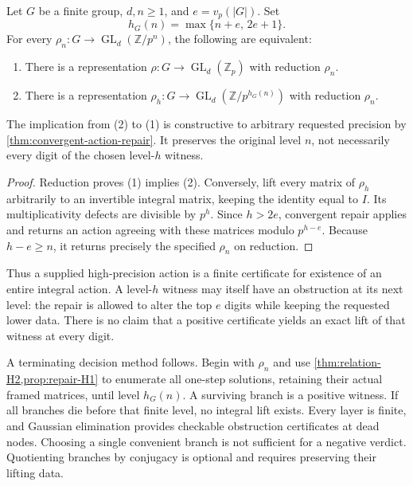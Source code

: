 \begin{theorem}\label{thm:finite-action-horizon}
Let $G$ be a finite group, $d,n\geq1$, and $e=v_p(|G|)$. Set
\[
 \boxed{h_G(n)=\max\{n+e,\,2e+1\}.}
\]
For every $\rho_n:G\to\operatorname{GL}_d(\mathbb Z/p^n)$, the following are equivalent:
\begin{enumerate}
\item There is a representation $\rho:G\to\operatorname{GL}_d(\mathbb Z_p)$ with reduction $\rho_n$.
\item There is a representation $\rho_h:G\to\operatorname{GL}_d(\mathbb Z/p^{h_G(n)})$ with reduction $\rho_n$.
\end{enumerate}
The implication from (2) to (1) is constructive to arbitrary requested precision by \cref{thm:convergent-action-repair}. It preserves the original level $n$, not necessarily every digit of the chosen level-$h$ witness.
\end{theorem}
\begin{proof}
Reduction proves (1) implies (2). Conversely, lift every matrix of $\rho_h$ arbitrarily to an invertible integral matrix, keeping the identity equal to $I$. Its multiplicativity defects are divisible by $p^h$. Since $h>2e$, convergent repair applies and returns an action agreeing with these matrices modulo $p^{h-e}$. Because $h-e\geq n$, it returns precisely the specified $\rho_n$ on reduction.
\end{proof}

Thus a supplied high-precision action is a finite certificate for existence of an entire integral action. A level-$h$ witness may itself have an obstruction at its next level: the repair is allowed to alter the top $e$ digits while keeping the requested lower data. There is no claim that a positive certificate yields an exact lift of that witness at every digit.

A terminating decision method follows. Begin with $\rho_n$ and use \cref{thm:relation-H2,prop:repair-H1} to enumerate all one-step solutions, retaining their actual framed matrices, until level $h_G(n)$. A surviving branch is a positive witness. If all branches die before that finite level, no integral lift exists. Every layer is finite, and Gaussian elimination provides checkable obstruction certificates at dead nodes. Choosing a single convenient branch is not sufficient for a negative verdict. Quotienting branches by conjugacy is optional and requires preserving their lifting data.

